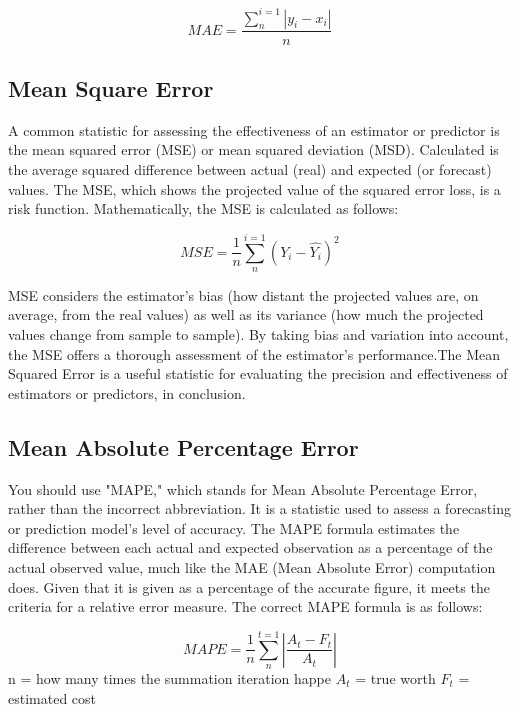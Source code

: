 \documentclass[a4paper,fleqn]{cas-sc}
\begin{document}
\begin{equation}
MAE = \frac{\sum_{n}^{i=1}|y_i-x_i|}{n}
\end{equation}

\subsection{Mean Square Error}
A common statistic for assessing the effectiveness of an estimator or predictor is the mean squared error (MSE) or mean squared deviation (MSD). Calculated is the average squared difference between actual (real) and expected (or forecast) values. The MSE, which shows the projected value of the squared error loss, is a risk function.\cite{kumari2021deep} Mathematically, the MSE is calculated as follows:\cite{}

\begin{equation}
MSE = \frac{1}{n}\sum_{n}^{i=1}(Y_i-\hat{Y_i})^{2}
\end{equation}

MSE considers the estimator’s bias (how distant the projected values are, on average, from the real values) as well as its variance (how much the projected values change from sample to sample). By taking bias and variation into account, the MSE offers a thorough assessment of the estimator’s performance.The Mean Squared Error is a  useful statistic for evaluating the precision and effectiveness of estimators or predictors, in conclusion.\cite{gupta2023long}


\subsection{Mean Absolute Percentage Error}
You should use "MAPE," which stands for Mean Absolute Percentage Error, rather than the incorrect abbreviation.
It is a statistic used to assess a forecasting or prediction model’s level of accuracy. The MAPE formula estimates the difference between each actual and expected observation as a percentage of the actual observed value, much like the MAE (Mean Absolute Error) computation does. Given that it is given as a percentage of the accurate figure, it meets the criteria for a relative error measure. The correct MAPE formula is as follows:\cite{dhingra2023pseudo}

\begin{equation}
MAPE = \frac{1}{n}\sum_{n}^{t=1}|\frac{A_t-F_t}{A_t}|
\end{equation}
n = how many times the summation iteration happe
${A_t}$ = true worth 
${F_t }$ = estimated cost
\end{document}
